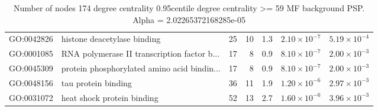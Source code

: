 \begin{table}[ht]
\begin{adjustbox}{max width=\textwidth}
\begin{tabular}{llrrrrr}
  GO:0042826 & histone deacetylase binding & 25 & 10 & 1.3 & $2.10 \times 10^{-7}$ & $5.19 \times 10^{-4}$ \\ 
  GO:0001085 & RNA polymerase II transcription factor b... & 17 & 8 & 0.9 & $8.10 \times 10^{-7}$ & $2.00 \times 10^{-3}$ \\ 
  GO:0045309 & protein phosphorylated amino acid bindin... & 17 & 8 & 0.9 & $8.10 \times 10^{-7}$ & $2.00 \times 10^{-3}$ \\ 
  GO:0048156 & tau protein binding & 36 & 11 & 1.9 & $1.20 \times 10^{-6}$ & $2.97 \times 10^{-3}$ \\ 
  GO:0031072 & heat shock protein binding & 52 & 13 & 2.7 & $1.60 \times 10^{-6}$ & $3.96 \times 10^{-3}$ \\ 
   \hline
\end{tabular}
\end{adjustbox}
\caption{Number of nodes 174 degree centrality 0.95centile  degree centrality >= 59 MF background PSP. Alpha = 2.02265372168285e-05} 
\label{tab:Number of nodes 174 degree centrality 0.95centile  degree centrality >= 59 MF background PSP. Alpha = 2.02265372168285e-05}
\end{table}
  

